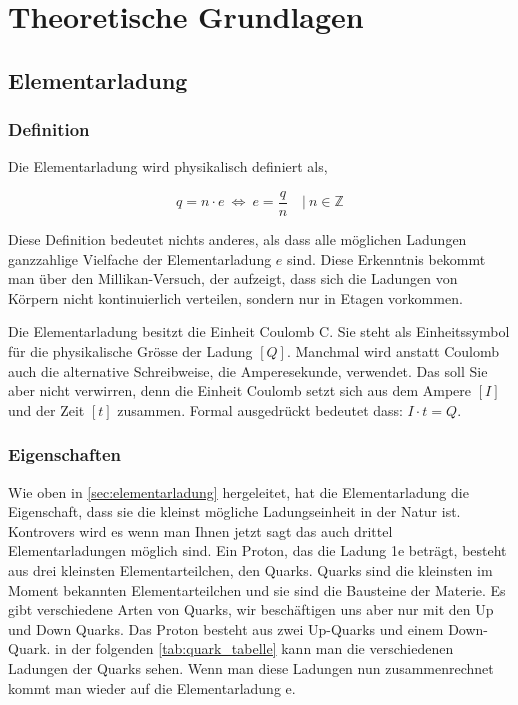 \chapter{Theoretische Grundlagen}\label{ch:theorieGrundlagen}
\section{Elementarladung}\label{sec:elementarladung}
\subsection{Definition}\label{sub:definition}
Die Elementarladung wird physikalisch definiert als,

\begin{equation}\label{eq:definition}
 q  =  n \cdot e \:  \Leftrightarrow \: e = \frac{q}{n} \quad | \ n \in \mathbb{Z}
\end{equation}

\noindent Diese Definition bedeutet nichts anderes, als dass alle möglichen Ladungen ganzzahlige Vielfache der Elementarladung $e$ sind. Diese Erkenntnis bekommt man über den Millikan-Versuch, der aufzeigt, dass sich die Ladungen von Körpern nicht kontinuierlich verteilen, sondern nur in Etagen vorkommen. 

Die Elementarladung besitzt die Einheit Coulomb C. Sie steht als Einheitssymbol für die physikalische Grösse der Ladung $[Q]$. Manchmal wird anstatt Coulomb auch die alternative Schreibweise, die Amperesekunde, verwendet. Das soll Sie aber nicht verwirren, denn die Einheit Coulomb setzt sich aus dem Ampere $[I]$ und der Zeit $[t]$ zusammen. Formal ausgedrückt bedeutet dass: $I \cdot t = Q$. 

\subsection{Eigenschaften}\label{sub:eigenschaften}
Wie oben in \autoref{sec:elementarladung} hergeleitet, hat die Elementarladung die Eigenschaft, dass sie die kleinst mögliche Ladungseinheit in der Natur ist. Kontrovers wird es wenn man Ihnen jetzt sagt das auch drittel Elementarladungen möglich sind. Ein Proton, das die Ladung 1e beträgt, besteht aus drei kleinsten Elementarteilchen, den Quarks. Quarks sind die kleinsten im Moment bekannten Elementarteilchen und sie sind die Bausteine der Materie. Es gibt verschiedene Arten von Quarks, wir beschäftigen uns aber nur mit den Up und Down Quarks. Das Proton besteht aus zwei Up-Quarks und einem Down-Quark. in der folgenden \autoref{tab:quark_tabelle} kann man die verschiedenen Ladungen der Quarks sehen. Wenn man diese Ladungen nun zusammenrechnet kommt man wieder auf die Elementarladung e. 

